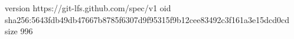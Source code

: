 version https://git-lfs.github.com/spec/v1
oid sha256:5643fdb49db47667b8785f6307d9f95315f9b12cee83492c3f161a3e15dcd0cd
size 996
